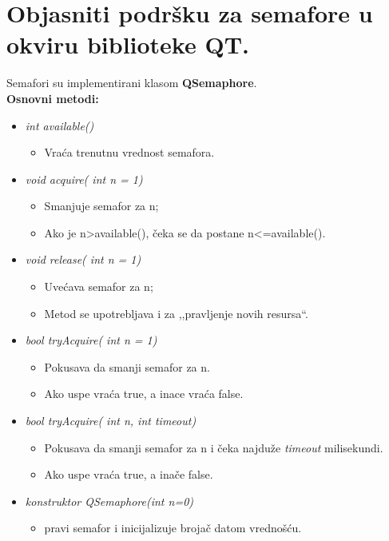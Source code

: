 \documentclass[a4paper]{article}
\begin{document}
\section{Objasniti podršku za semafore u okviru biblioteke QT.}
  Semafori su implementirani klasom \textbf{QSemaphore}. \\
  \textbf{Osnovni metodi:}
    \begin{itemize}
      \item \textit{int available()}
        \begin{itemize}
          \item Vraća trenutnu vrednost semafora.
        \end{itemize}
      \item \textit{void acquire( int n = 1)}
        \begin{itemize}
          \item Smanjuje semafor za n;
          \item Ako je n>available(), čeka se da postane n<=available().
        \end{itemize}
      \item \textit{void release( int n = 1)}
        \begin{itemize}
          \item Uvećava semafor za n;
          \item Metod se upotrebljava i za ,,pravljenje novih resursa``.
        \end{itemize}
      \item \textit{bool tryAcquire( int n = 1)}
        \begin{itemize}
          \item Pokusava da smanji semafor za n.
          \item Ako uspe vraća true, a inace vraća false.
        \end{itemize}
      \item \textit{bool tryAcquire( int n, int timeout)}
        \begin{itemize}
          \item Pokusava da smanji semafor za n i čeka najduže \textit{timeout} milisekundi.
          \item Ako uspe vraća true, a inače false.
        \end{itemize}
      \item \textit{konstruktor QSemaphore(int n=0)}
        \begin{itemize}
          \item pravi semafor i inicijalizuje brojač datom vrednošću.
        \end{itemize}
    \end{itemize}
\end{document}
